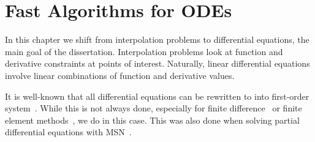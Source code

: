\chapter{Fast Algorithms for ODEs}
\label{chap:fast_ode}

In this chapter we shift from interpolation problems to differential equations,
the main goal of the dissertation.
Interpolation problems look at
function and derivative constraints at points of interest.
Naturally, linear differential equations involve linear combinations
of function and derivative values.

It is well-known that all differential equations can be rewritten
to into first-order system~\cite{petzoldODEs,ascherBVPs}.
While this is not always done, especially for finite
difference~\cite{levequeFDMs} or finite element methods~\cite{brennerFEMs},
we do in this case. This was also done when solving partial differential
equations with MSN~\cite{msnPDE}.

